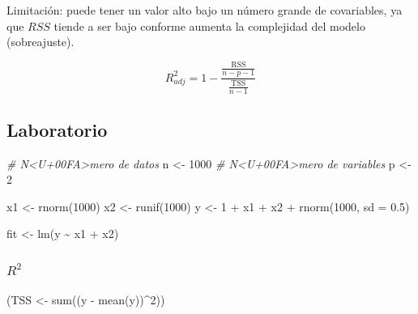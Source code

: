 \documentclass[
  12pt,
]{book}
\newenvironment{Shaded}{\begin{snugshade}}{\end{snugshade}}
\newcommand{\AttributeTok}[1]{\textcolor[rgb]{0.77,0.63,0.00}{#1}}
\newcommand{\CommentTok}[1]{\textcolor[rgb]{0.56,0.35,0.01}{\textit{#1}}}
\newcommand{\DecValTok}[1]{\textcolor[rgb]{0.00,0.00,0.81}{#1}}
\newcommand{\FloatTok}[1]{\textcolor[rgb]{0.00,0.00,0.81}{#1}}
\newcommand{\FunctionTok}[1]{\textcolor[rgb]{0.00,0.00,0.00}{#1}}
\newcommand{\NormalTok}[1]{#1}
\newcommand{\OtherTok}[1]{\textcolor[rgb]{0.56,0.35,0.01}{#1}}
\newcommand{\SpecialCharTok}[1]{\textcolor[rgb]{0.00,0.00,0.00}{#1}}
\providecommand{\tightlist}{%
  \setlength{\itemsep}{0pt}\setlength{\parskip}{0pt}}
\theoremstyle{definition}
\theoremstyle{definition}
\theoremstyle{definition}
\theoremstyle{definition}
\theoremstyle{remark}
\begin{document}
Limitación: puede tener un valor alto bajo un número grande de covariables, ya que \(RSS\) tiende a ser bajo conforme aumenta la complejidad del modelo (sobreajuste).

\begin{description}
\tightlist
\item[Estadístico \(R^{2}\) ajustado]
\begin{equation*}
R^{2}_{adj} = 1-\frac{\frac{\mathrm{RSS}}{n-p-1}}{\frac{\mathrm{TSS}}{n-1}}
\end{equation*}
\end{description}

\hypertarget{laboratorio-3}{%
\subsection{Laboratorio}\label{laboratorio-3}}

\begin{Shaded}
\begin{Highlighting}[]
\CommentTok{\# N\textless{}U+00FA\textgreater{}mero de datos}
\NormalTok{n }\OtherTok{\textless{}{-}} \DecValTok{1000}
\CommentTok{\# N\textless{}U+00FA\textgreater{}mero de variables}
\NormalTok{p }\OtherTok{\textless{}{-}} \DecValTok{2}

\NormalTok{x1 }\OtherTok{\textless{}{-}} \FunctionTok{rnorm}\NormalTok{(}\DecValTok{1000}\NormalTok{)}
\NormalTok{x2 }\OtherTok{\textless{}{-}} \FunctionTok{runif}\NormalTok{(}\DecValTok{1000}\NormalTok{)}
\NormalTok{y }\OtherTok{\textless{}{-}} \DecValTok{1} \SpecialCharTok{+}\NormalTok{ x1 }\SpecialCharTok{+}\NormalTok{ x2 }\SpecialCharTok{+} \FunctionTok{rnorm}\NormalTok{(}\DecValTok{1000}\NormalTok{, }\AttributeTok{sd =} \FloatTok{0.5}\NormalTok{)}

\NormalTok{fit }\OtherTok{\textless{}{-}} \FunctionTok{lm}\NormalTok{(y }\SpecialCharTok{\textasciitilde{}}\NormalTok{ x1 }\SpecialCharTok{+}\NormalTok{ x2)}
\end{Highlighting}
\end{Shaded}

\hypertarget{r2}{%
\subsubsection{\texorpdfstring{\(R^2\)}{R\^{}2}}\label{r2}}

\begin{Shaded}
\begin{Highlighting}[]
\NormalTok{(TSS }\OtherTok{\textless{}{-}} \FunctionTok{sum}\NormalTok{((y }\SpecialCharTok{{-}} \FunctionTok{mean}\NormalTok{(y))}\SpecialCharTok{\^{}}\DecValTok{2}\NormalTok{))}
\end{Highlighting}
\end{Shaded}
\end{document}
